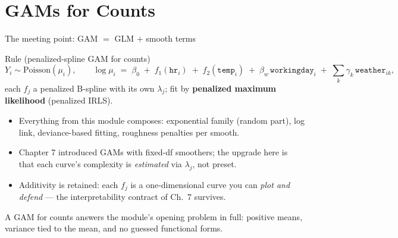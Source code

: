 \documentclass[aspectratio=169,11pt]{beamer}
\begin{document}
\section{GAMs for Counts}

\begin{frame}{The meeting point: GAM $=$ GLM $+$ smooth terms}
  \begin{block}{Rule (penalized-spline GAM for counts)}
    \[
      Y_i \sim \text{Poisson}(\mu_i), \qquad
      \log \mu_i \;=\; \beta_0 \;+\; f_1(\texttt{hr}_i) \;+\; f_2(\texttt{temp}_i)
      \;+\; \beta_w\,\texttt{workingday}_i \;+\; \textstyle\sum_k \gamma_k\, \texttt{weather}_{ik},
    \]
    each $f_j$ a penalized B-spline with its own $\lambda_j$; fit by
    \textbf{penalized maximum likelihood} (penalized IRLS).
  \end{block}
  \begin{readme}
    \begin{itemize}
      \item Everything from this module composes: exponential family (random part),
            log link, deviance-based fitting, roughness penalties per smooth.
      \item Chapter 7 introduced GAMs with fixed-df smoothers; the upgrade here is that
            each curve's complexity is \emph{estimated} via $\lambda_j$, not preset.
      \item Additivity is retained: each $f_j$ is a one-dimensional curve you can
            \emph{plot and defend} --- the interpretability contract of Ch.\ 7 survives.
    \end{itemize}
  \end{readme}
  \begin{takeaway}
    A GAM for counts answers the module's opening problem in full: positive means,
    variance tied to the mean, and no guessed functional forms.
  \end{takeaway}
\end{frame}
\end{document}
